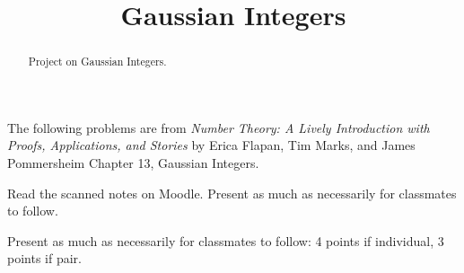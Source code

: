 \documentclass[letterpaper, 11 pt,handout]{ximera}
\title{Gaussian Integers}
\begin{document}
\begin{abstract}
 Project on Gaussian Integers.
\end{abstract}
\maketitle

The following problems are from \emph{Number Theory: A Lively Introduction with Proofs, Applications, and Stories} by Erica Flapan, Tim Marks, and James Pommersheim Chapter 13, Gaussian Integers.

	Read the scanned notes on Moodle. Present as much as necessarily for classmates to follow.
	
\begin{rubric}
 	Present as much as necessarily for classmates to follow: 4 points if individual, 3 points if pair.
\end{rubric}
\end{document}
